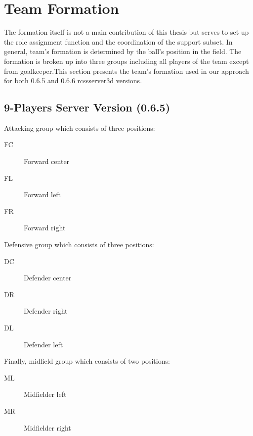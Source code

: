 \section{Team Formation}
The formation itself is not a main contribution of this thesis but serves to set up the role assignment function and the coordination of the support subset. In general, team's formation is determined by the ball's position in the field. The formation is broken up into three groups including all players of the team except from goalkeeper.This section presents the team's formation used in our approach for both 0.6.5 and 0.6.6 rcssserver3d versions.
\subsection{9-Players Server Version (0.6.5)}
Attacking group which consists of three positions:
\begin{description}
\item[FC] Forward center
\item[FL] Forward left
\item[FR] Forward right
\end{description}
Defensive group which consists of three positions:
\begin{description}
\item[DC] Defender center
\item[DR] Defender right 
\item[DL] Defender left
\end{description}
Finally, midfield group which consists of two positions:
\begin{description}
\item[ML] Midfielder left
\item[MR] Midfielder right
\end{description}
